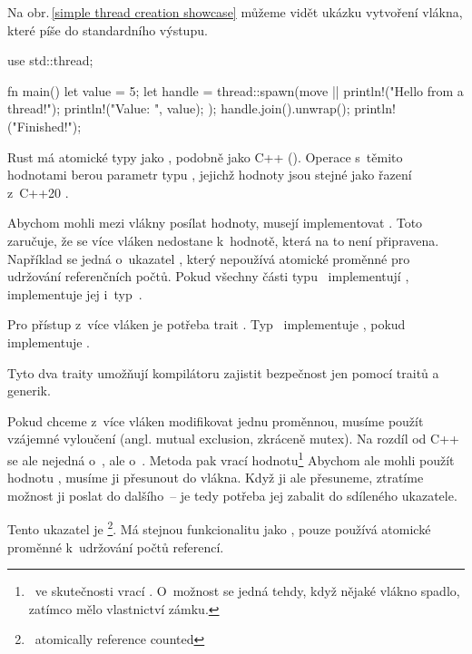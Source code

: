 \documentclass[main.tex]{subfiles}
\begin{document}
Na obr.\,\ref{simple thread creation showcase} můžeme vidět ukázku vytvoření vlákna, které
píše do standardního výstupu.

\obrazek
\begin{rustcode}
    use std::thread;

    fn main() {
        let value = 5;
        let handle = thread::spawn(move || {
            println!("Hello from a thread!");
            println!("Value: {}", value);
        });
        handle.join().unwrap();
        println!("Finished!");
    }
\end{rustcode}


Rust má atomické typy jako , podobně jako C++ ().
Operace s~těmito hodnotami berou parametr typu , jejichž hodnoty jsou stejné jako řazení z~C++20 \cite[sync/atomic]{ruststd}.


Abychom mohli mezi vlákny posílat hodnoty, musejí implementovat . Toto
zaručuje, že se více vláken nedostane k~hodnotě, která na to není připravena. Například se
jedná o~ukazatel , který nepoužívá atomické proměnné pro udržování
referenčních počtů. Pokud všechny části typu~ implementují ,
implementuje jej i~typ~. \cite[marker/trait.Send]{ruststd}

Pro přístup z~více vláken je potřeba trait . Typ~ implementuje
, pokud  implementuje .
\cite[marker/trait.Sync]{ruststd}

Tyto dva traity umožňují kompilátoru zajistit bezpečnost jen pomocí traitů a generik.


Pokud chceme z~více vláken modifikovat jednu proměnnou, musíme použít vzájemné vyloučení
(angl. mutual exclusion, zkráceně mutex). Na rozdíl od C++ se ale nejedná o~,
ale o~. Metoda  pak vrací hodnotu\footnote{~ve skutečnosti
    vrací . O~možnost  se jedná tehdy, když nějaké vlákno spadlo,
    zatímco mělo vlastnictví zámku.
} Abychom ale mohli použít hodnotu , musíme ji přesunout do vlákna. Když
ji ale přesuneme, ztratíme možnost ji poslat do dalšího~-- je tedy potřeba jej zabalit
do sdíleného ukazatele.

Tento ukazatel je \footnote{~atomically reference counted}. Má stejnou
funkcionalitu jako , pouze používá atomické proměnné k~udržování počtů
referencí. \cite[sekce\,16.3]{thebook}
\end{document}
